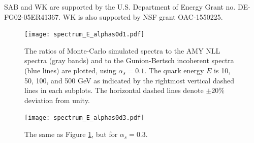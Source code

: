 \documentclass[aps, prc, reprint, amsmath, groupedaddress, nofootinbib]{revtex4-1}
\begin{document}
\begin{acknowledgments}
SAB and WK are supported by the U.S. Department of Energy Grant no. DE-FG02-05ER41367. WK is also supported by NSF grant OAC-1550225.
\end{acknowledgments}

\begin{appendices}
\begin{figure}
\texttt{[image: spectrum\_E\_alphas0d1.pdf]}
\caption{The ratios of Monte-Carlo simulated spectra to the AMY NLL spectra (gray bands) and to the Gunion-Bertsch incoherent spectra (blue lines) are plotted, using $\alpha_s = 0.1$. The quark energy $E$ is 10, 50, 100, and 500 GeV as indicated by the rightmost vertical dashed lines in each subplots. The horizontal dashed lines denote $\pm 20\%$ deviation from unity.}
\label{fig:spectra-alphas=0.1}
\end{figure}

\begin{figure}
\texttt{[image: spectrum\_E\_alphas0d3.pdf]}
\caption{The same as Figure \ref{fig:spectra-alphas=0.1}, but for $\alpha_s = 0.3$.}
\label{fig:spectra-alphas=0.3}
\end{figure}
\end{appendices}
\end{document}
